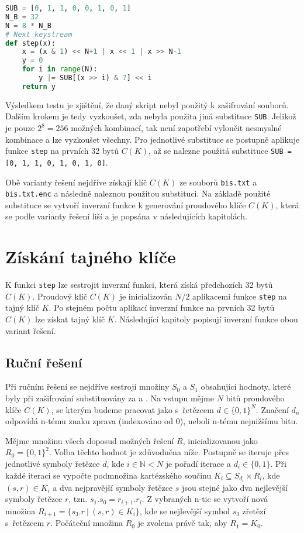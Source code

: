 \documentclass[11pt,a4paper]{article}
\begin{document}
\begin{lstlisting}[language=python, caption=Generování proudového klíče $C(K)$ ze souboru \texttt{super\_cipher.py}., frame=single, captionpos=b, label=lst:step]
SUB = [0, 1, 1, 0, 0, 1, 0, 1]
N_B = 32
N = 8 * N_B
# Next keystream
def step(x):
    x = (x & 1) << N+1 | x << 1 | x >> N-1
    y = 0
    for i in range(N):
        y |= SUB[(x >> i) & 7] << i
    return y
\end{lstlisting}

Výsledkem testu je zjištění, že daný skript nebyl použitý k zašifrování souborů. Dalším krokem je tedy vyzkoušet, zda nebyla použita jiná substituce \texttt{SUB}. Jelikož je pouze $2^8 = 256$ možných kombinací, tak není zapotřebí vyloučit nesmyslné kombinace a lze vyzkoušet všechny. Pro jednotlivé substituce se postupně aplikuje funkce \texttt{step} na prvních 32 bytů $C(K)$, až se nalezne použitá substituce \texttt{SUB = [0, 1, 1, 0, 1, 0, 1, 0]}. 

Obě varianty řešení nejdříve získají klíč $C(K)$ ze souborů \texttt{bis.txt} a \texttt{bis.txt.enc} a následně naleznou použitou substituci. Na základě použité substituce se vytvoří inverzní funkce k generování proudového klíče $C(K)$, která se podle varianty řešení liší a je popsána v následujících kapitolách.

\section{Získání tajného klíče}
K funkci \texttt{step} lze sestrojit inverzní funkci, která získá předchozích 32 bytů $C(K)$. Proudový klíč $C(K)$ je inicializován $N/2$ aplikacemi funkce \texttt{step} na tajný klíč $K$. Po stejném počtu aplikací inverzní funkce na prvních 32 bytů $C(K)$ lze získat tajný klíč $K$. Následující kapitoly popisují inverzní funkce obou variant řešení.

\subsection{Ruční řešení}

Při ručním řešení se nejdříve sestrojí množiny $S_0$ a $S_1$ obsahující hodnoty, které byly při zašifrování substituovány za  a . 
Na vstupu mějme $N$ bitů proudového klíče $C(K)$, se kterým budeme pracovat jako s~řetězcem $d\in\{0, 1\}^N$. Značení $d_n$ odpovídá n-tému znaku zprava (indexováno od 0), neboli n-tému nejnižšímu bitu. 

Mějme množinu všech doposud možných řešení $R$, inicializovanou jako $R_0 = \{0, 1\}^2$. 
Volba těchto hodnot je zdůvodněna níže. 
Postupně se iteruje přes jednotlivé symboly řetězce $d$, kde $i \in \mathbb{N} < N$ je pořadí iterace a $d_i \in \{0, 1\}$. 
Při každé iteraci se vypočte podmnožina kartézského součinu $K_i \subseteq S_{d_i} \times R_i$, kde $(s, r) \in K_i$ a dva nejpravější symboly řetězce $s$ jsou stejné jako dva nejlevější symboly řetězce $r$, tzn. $s_1.s_0 = r_{i+1}.r_{i}$.
Z vybraných n-tic se vytvoří nová množina $R_{i+1} = \{s_3.r\ |\ (s, r) \in K_i\}$, kde se nejlevější symbol $s_3$ zřetězí s~řetězcem $r$. 
Počáteční množina $R_0$ je zvolena právě tak, aby $R_1 = K_0$.
\end{document}
